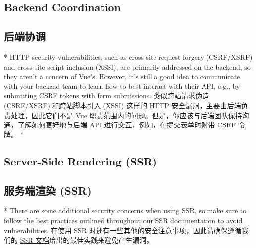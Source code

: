 \begin{paracol}{2}
\subsection{Backend Coordination}
\switchcolumn
\subsection{后端协调}
\switchcolumn[0]*%
HTTP security vulnerabilities, such as cross-site request forgery
(CSRF/XSRF) and cross-site script inclusion (XSSI), are primarily
addressed on the backend, so they aren't a concern of Vue's. However,
it's still a good idea to communicate with your backend team to learn
how to best interact with their API, e.g., by submitting CSRF tokens
with form submissions.
\switchcolumn
类似跨站请求伪造 (CSRF/XSRF) 和跨站脚本引入 (XSSI) 这样的 HTTP
安全漏洞，主要由后端负责处理，因此它们不是 Vue
职责范围内的问题。但是，你应该与后端团队保持沟通，了解如何更好地与后端
API 进行交互，例如，在提交表单时附带 CSRF 令牌。
\switchcolumn[0]*%
\subsection{Server-Side Rendering (SSR)}
\switchcolumn
\subsection{服务端渲染 (SSR)}
\switchcolumn[0]*%
There are some additional security concerns when using SSR, so make sure
to follow the best practices outlined throughout
\href{https://vuejs.org/guide/scaling-up/ssr.html}{our SSR
documentation} to avoid vulnerabilities.
\switchcolumn
在使用 SSR 时还有一些其他的安全注意事项，因此请确保遵循我们的
\href{https://cn.vuejs.org/guide/scaling-up/ssr.html}{SSR
文档}给出的最佳实践来避免产生漏洞。 
\end{paracol}


\begin{paracol}{2} 

\end{paracol}



\begin{paracol}{2} 

\end{paracol}



\begin{paracol}{2} 

\end{paracol}


\begin{paracol}{2} 

\end{paracol}



\begin{paracol}{2} 

\end{paracol}